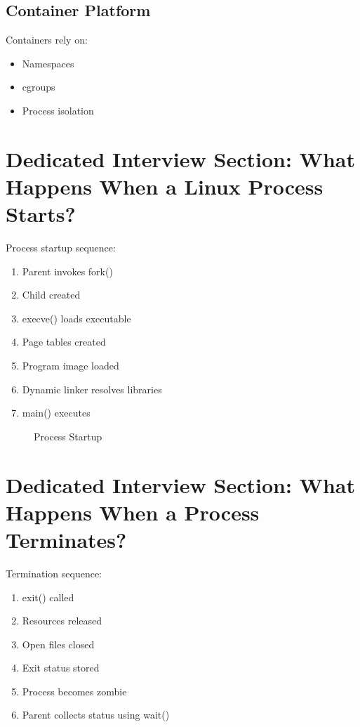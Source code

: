 \subsection{Container Platform}

Containers rely on:

\begin{itemize}
\item Namespaces
\item cgroups
\item Process isolation
\end{itemize}

\section{Dedicated Interview Section: What Happens When a Linux Process Starts?}

Process startup sequence:

\begin{enumerate}
\item Parent invokes fork()
\item Child created
\item execve() loads executable
\item Page tables created
\item Program image loaded
\item Dynamic linker resolves libraries
\item main() executes
\end{enumerate}

\begin{figure}[H]
\centering
{}
\caption{Process Startup}
\end{figure}

\section{Dedicated Interview Section: What Happens When a Process Terminates?}

Termination sequence:

\begin{enumerate}
\item exit() called
\item Resources released
\item Open files closed
\item Exit status stored
\item Process becomes zombie
\item Parent collects status using wait()
\end{enumerate}

